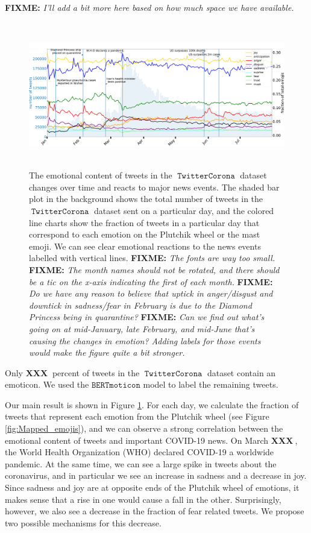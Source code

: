 \documentclass[11pt]{article}
\newcommand{\fixme}[1]{{\color{red} \textbf{FIXME:} {\textit {#1}}}}
\newcommand{\XXX}{{\textbf{XXX}}~}
\newcommand{\bertmoji}{\texttt{BERTmoticon}}
\DeclareMathOperator{\corona}{\texttt{TwitterCorona}}
\begin{document}
\fixme{I'll add a bit more here based on how much space we have available.}

\begin{figure}
    \centering
    \includegraphics[width=\textwidth,height=2.5in]{images/twitter_graph_fixed.pdf}
    \caption{
        The emotional content of tweets in the $\corona$ dataset changes over time and reacts to major news events.
        The shaded bar plot in the background shows the total number of tweets in the $\corona$ dataset sent on a particular day,
        and the colored line charts show the fraction of tweets in a particular day that correspond to each emotion on the Plutchik wheel or the mast emoji.
        We can see clear emotional reactions to the news events labelled with vertical lines.
        \fixme{The fonts are way too small.}
        \fixme{The month names should not be rotated, and there should be a tic on the x-axis indicating the first of each month.}
        \fixme{
            Do we have any reason to believe that uptick in anger/disgust and downtick in sadness/fear in February is due to the Diamond Princess being in quarantine?
        }
        \fixme{
            Can we find out what's going on at mid-January, late February, and mid-June that's causing the changes in emotion?
            Adding labels for those events would make the figure quite a bit stronger.
        }
    }
    \label{fig:tweets_per_day_sent}
\end{figure}

Only $\XXX$ percent of tweets in the $\corona$ dataset contain an emoticon.
We used the $\bertmoji$ model to label the remaining tweets.

Our main result is shown in Figure \ref{fig:tweets_per_day_sent}.
For each day, we calculate the fraction of tweets that represent each emotion from the Plutchik wheel (see Figure \ref{fig:Mapped_emojis}),
and we can observe a strong correlation between the emotional content of tweets and important COVID-19 news.
On March $\XXX$, the World Health Organization (WHO) declared COVID-19 a worldwide pandemic.
At the same time, we can see a large spike in tweets about the coronavirus,
and in particular we see an increase in sadness and a decrease in joy.
Since sadness and joy are at opposite ends of the Plutchik wheel of emotions,
it makes sense that a rise in one would cause a fall in the other.
Surprisingly, however, we also see a decrease in the fraction of fear related tweets.
We propose two possible mechanisms for this decrease.
\end{document}
